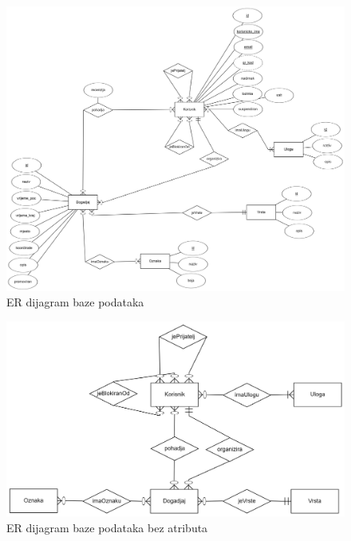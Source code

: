 			\begin{figure}[h]
				\includegraphics[width=\textwidth]{dijagrami/Baza podataka/ER model.png}
				\caption{ER dijagram baze podataka}
			\end{figure}
				
			\newpage
			\vfill	
			
			\begin{figure}[h]
				\includegraphics[width=\textwidth]{dijagrami/Baza podataka/ER model (bez atributa).png}
				\caption{ER dijagram baze podataka bez atributa}
			\end{figure}
				
